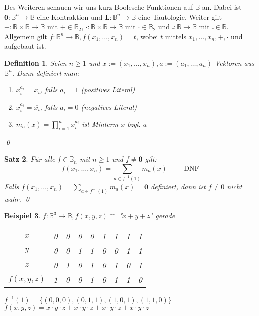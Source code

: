 \documentclass[ngerman]{scrartcl}
\theoremstyle{custom}
\newtheorem{mdef}{Definition} \numberwithin{mdef}{subsection}
\newtheorem{mex}[mdef]{Beispiel}
\newtheorem{ms}[mdef]{Satz}
\newcommand{\0}{\mathbf{0}}
\newcommand{\1}{\mathbf{L}}
\begin{document}
Des Weiteren schauen wir uns kurz Boolesche Funktionen auf
$\mathds{B}$ an. Dabei ist $\0: \mathds{B}^n \rightarrow \mathds{B}$
eine Kontraktion und $\1: \mathds{B}^n \rightarrow \mathds{B}$ eine
Tautologie. Weiter gilt $+: \mathds{B} \times \mathds{B} \rightarrow
\mathds{B}$ mit $+ \in \mathds{B}_2$, $\cdot: \mathds{B} \times \mathds{B} \rightarrow
\mathds{B}$ mit $\cdot \in \mathds{B}_2$ und $\bar~: \mathds{B} \rightarrow
\mathds{B}$ mit $\bar~ \in \mathds{B}$. Allgemein gilt $f:
\mathds{B}^n \rightarrow \mathds{B}, f(x_1, \dots, x_n) = t$, wobei
$t$ mittels $x_1, \dots, x_n, +, \cdot$ und $\bar~$ aufgebaut ist.

\begin{mdef}
Seien $n \geq 1$ und $x:=(x_1, \dots, x_n), a:= (a_1, \dots, a_n)$
Vektoren aus $\mathds{B}^n$. Dann definiert man:
\begin{enumerate}
\item $x_i^{a_i} = x_i$, falls $a_i = 1$ (positives Literal)
\item $x_i^{a_i} = \overline{x_i}$, falls $a_i = 0$ (negatives
  Literal)
\item $m_a(x) = \prod_{i=1}^{n} x_i^{a_i}$ ist Minterm $x$ bzgl. $a$
\end{enumerate}
\qed
\end{mdef}

\begin{ms}
F\"ur alle $f \in \mathds{B}_n$ mit $n \geq 1$ und $f \not = \0$
gilt:
\begin{equation*}
f(x_1, \dots, x_n) = \sum_{a \in f^{-1}(1)} m_a(x) \hspace{1cm}
  \text{DNF}
\end{equation*}
Falls $f(x_1, \dots, x_n) = \sum_{a\in f^{-1}(1)} m_a(x) = \0$ definiert, dann ist $f \not = 0$ nicht wahr.
\qed
\end{ms}
\begin{mex}
$f: \mathds{B}^3 \rightarrow \mathds{B}, f(x,y,z)
\mathrel{\widehat{=}}$ "$x+y+z$" gerade

\begin{table}[h]
\begin{tabular}{c|cccccccc}
$x$ & 0 &0 &0 &0 &1 & 1 & 1 &1 \\
$y$ &0 & 0 & 1 & 1 & 0 & 0 &1 & 1\\
$z$ & 0 & 1 & 0 & 1 & 0 & 1 & 0 & 1 \\
\hline $f(x,y,z)$ & 1 & 0 & 0 & 1 & 0 & 1 & 1 & 0\\
\end{tabular}
\end{table}
$f^{-1}(1) = \{ (0,0,0), (0,1,1), (1,0,1), (1,1,0)\}$\\
$f(x,y,z) = \bar x \cdot \bar y \cdot \bar z + \bar x \cdot y \cdot z
+ x \cdot \bar y \cdot z + x \cdot y \cdot \bar z$
\end{mex}
\end{document}
